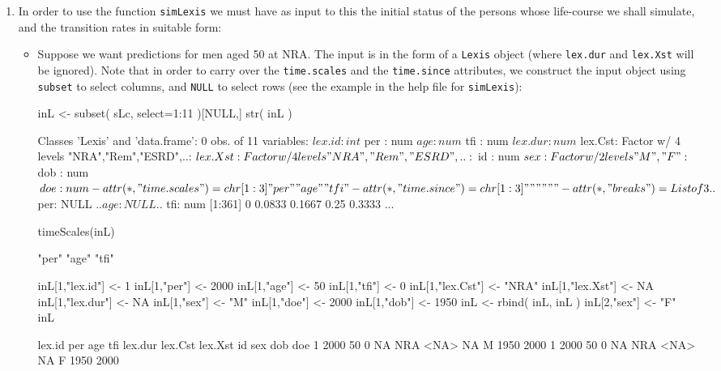\begin{enumerate}[resume]
\item In order to use the function \texttt{simLexis} we must have as input
  to this the initial status of the persons whose life-course we
  shall simulate, and the transition rates in suitable form:

\begin{itemize}
\item Suppose we want predictions for men aged 50 at
  NRA. The input is in the form of a \texttt{Lexis} object (where
  \texttt{lex.dur} and \texttt{lex.Xst} will be ignored). Note that in
  order to carry over the \texttt{time.scales} and the
  \texttt{time.since} attributes, we construct the input object using
  \texttt{subset} to select columns, and \texttt{NULL} to select rows
  (see the example in the help file for \texttt{simLexis}):
\begin{Schunk}
\begin{Sinput}
 inL <- subset( sLc, select=1:11 )[NULL,]
 str( inL )
\end{Sinput}
\begin{Soutput}
Classes 'Lexis' and 'data.frame':	0 obs. of  11 variables:
 $ lex.id : int 
 $ per    : num 
 $ age    : num 
 $ tfi    : num 
 $ lex.dur: num 
 $ lex.Cst: Factor w/ 4 levels "NRA","Rem","ESRD",..: 
 $ lex.Xst: Factor w/ 4 levels "NRA","Rem","ESRD",..: 
 $ id     : num 
 $ sex    : Factor w/ 2 levels "M","F": 
 $ dob    : num 
 $ doe    : num 
 - attr(*, "time.scales")= chr [1:3] "per" "age" "tfi"
 - attr(*, "time.since")= chr [1:3] "" "" ""
 - attr(*, "breaks")=List of 3
  ..$ per: NULL
  ..$ age: NULL
  ..$ tfi: num [1:361] 0 0.0833 0.1667 0.25 0.3333 ...
\end{Soutput}
\begin{Sinput}
 timeScales(inL)
\end{Sinput}
\begin{Soutput}
[1] "per" "age" "tfi"
\end{Soutput}
\begin{Sinput}
 inL[1,"lex.id"] <- 1
 inL[1,"per"] <- 2000
 inL[1,"age"] <- 50
 inL[1,"tfi"] <- 0
 inL[1,"lex.Cst"] <- "NRA"
 inL[1,"lex.Xst"] <- NA
 inL[1,"lex.dur"] <- NA
 inL[1,"sex"] <- "M"
 inL[1,"doe"] <- 2000
 inL[1,"dob"] <- 1950
 inL <- rbind( inL, inL )
 inL[2,"sex"] <- "F"
 inL
\end{Sinput}
\begin{Soutput}
 lex.id  per age tfi lex.dur lex.Cst lex.Xst id sex  dob  doe
      1 2000  50   0      NA     NRA    <NA> NA   M 1950 2000
      1 2000  50   0      NA     NRA    <NA> NA   F 1950 2000
\end{Soutput}

\end{Schunk}
\end{itemize}
\end{enumerate}
